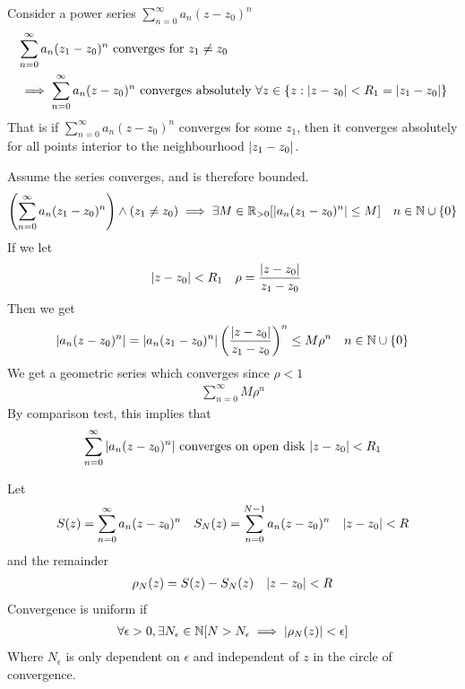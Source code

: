 \documentclass[12pt, english]{book}
\makeatletter
\renewenvironment{proof}[1][\proofname]{\par
	\pushQED{\qed}%
	\normalfont \topsep6\p@\@plus6\p@\relax
	\list{}{%
		\settowidth{\leftmargin}{\itshape\proofname:\hskip\labelsep}%
		\setlength{\labelwidth}{0pt}%
		\setlength{\itemindent}{-\leftmargin}%
	}%
	\item[\hskip\labelsep\itshape#1\@addpunct{:}]\ignorespaces
}{%
	\popQED\endlist\@endpefalse
}
\makeatother
\begin{document}
	\begin{theorem}
		\label{Absolute Convergence of Power Series Theorem - Complex}
		Consider a power series \(\sum_{n=0}^{\infty} a_n (z-z_0)^n\)
		\begin{align*}
			&\sum_{n=0}^{\infty} a_n (z_1-z_0)^n \text{ converges for } z_1 \neq  z_0 \\ &\implies \sum_{n=0}^{\infty} a_n (z-z_0)^n \text{ converges absolutely } \forall z \in \{z : \abs{z-z_0}< R_1 = \abs{z_1 - z_0}\}
		\end{align*}
		That is if \(\sum_{n=0}^{\infty} a_n (z-z_0)^n\) converges for some \(z_1\), then it converges absolutely for all points interior to the neighbourhood \(\abs{z_1 - z_0}\).
	\end{theorem}
	\begin{proof}
		Assume the series converges, and is therefore bounded.
		\begin{align*}
			\left( \sum_{n=0}^{\infty} a_n (z_1 - z_0)^n \right) \land (z_1 \neq z_0) &\implies \exists M\in \mathbb{R}_{>0} [\abs{a_n (z_1 - z_0)^n}\leq M]	
				& n \in \mathbb{N}\cup \{0\}
		\end{align*}
		If we let
		\begin{align*}
			\abs{z-z_0} &< R_1 & \rho &= \frac{\abs{z-z_0}}{z_1 - z_0}
		\end{align*}
		Then we get 
		\begin{align*}
			\abs{a_n(z-z_0)^n} 
			&= \abs{a_n (z_1 - z_0)^n} \left(\frac{\abs{z-z_0}}{z_1 - z_0}\right)^n \leq M\rho^n
				& n \in \mathbb{N} \cup \{0\}
		\end{align*}
		We get a geometric series which converges since \(\rho<1\)
		\begin{align*}
			\sum_{n=0}^{\infty} M \rho^n
		\end{align*}
		By comparison test, this implies that 
		\begin{align*}
			\sum_{n=0}^{\infty} \abs{a_n (z-z_0)^n} \text{ converges on open disk } \abs{z-z_0}<R_1
		\end{align*}
	\end{proof}

	\begin{definition}
		\label{Uniform Convergence (Power Series) Definition - Complex}
		Let 
		\begin{align*}
			S(z) &= \sum_{n=0}^{\infty} a_n(z-z_0)^n  &
			S_N(z) &= \sum_{n=0}^{N-1} a_n(z-z_0)^n &
				\abs{z-z_0}<R
		\end{align*}
		and the remainder 
		\begin{align*}
			\rho_N (z) &= S(z) - S_N(z)		&	\abs{z-z_0} < R
		\end{align*}
		Convergence is uniform if 
		\begin{align*}
			\forall \epsilon > 0, \exists N_\epsilon \in \mathbb{N} [N > N_\epsilon \implies \abs{\rho_N(z)} < \epsilon]
		\end{align*}
		Where \(N_\epsilon\) is only dependent on \(\epsilon\) and independent of \(z\) in the circle of convergence.
	\end{definition}
\end{document}
